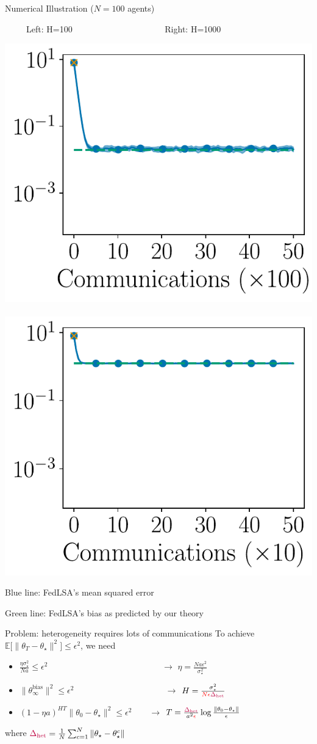 \documentclass[aspectratio=169,14pt]{beamer}
\begin{document}
\begin{frame}{Numerical Illustration ($N=100$ agents)}
  \vspace{-0.5em}
  
  \begin{center}
    ~~~~~Left: H=100~~~~~~~~~~~~~~~~~~~~~
    Right: H=1000
 
    \vspace{-1em}
   
    \includegraphics[width=0.4\linewidth]{images/plot_hg_100_n100_fedlsa.pdf}
    ~~
    \includegraphics[width=0.4\linewidth]{images/plot_hg_1000_n100_fedlsa.pdf}
  \end{center}

  \vspace{-1em}

  Blue line: FedLSA's mean squared error

  \vspace{-1em}

  Green line: FedLSA's bias as predicted by our theory
\end{frame}


\begin{frame}{Problem: heterogeneity requires lots of communications}
  To achieve $\mathbb{E} \Big[ \| {\theta_T - \theta_\star} \|^2 \Big] \le \epsilon^2$, we need
  \begin{itemize}
  \item $\frac{\eta \sigma_\star^2}{N a} \le \epsilon^2$ ~~~~~~\,~~~~~~~~~~~~~~~~~~~ $\rightarrow$ $\eta = \frac{N a \epsilon^2}{\sigma_\star^2}$
  \item $\| \theta_{\infty}^{\text{bias}} \|^2 \le \epsilon^2$ ~~~~~~~~~~~~~~~~~~~~ $\rightarrow$ $H = \frac{\sigma_\star^2 }{\textcolor{red}{N \epsilon} \textcolor{purple}{\Delta_{\text{het}}}}$
  \item $(1 - \eta a)^{H T} \| \theta_0 - \theta_\star \|^2 \le \epsilon^2$ ~~~\,$\rightarrow$ $T = \frac{\textcolor{purple}{\Delta_{\text{het}}}}{a^2 \textcolor{red}{\epsilon}} \log \tfrac{\| \theta_0 - \theta_\star \|}{ \epsilon }$
  \end{itemize}

  where $\textcolor{purple}{\Delta_{\text{het}}} = \frac{1}{N} \sum_{c=1}^N \| \theta_\star - \theta_\star^c \| $
\end{frame}
\end{document}
